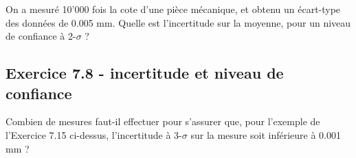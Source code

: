 On a mesuré 10'000 fois la cote d'une pièce mécanique, et obtenu un écart-type des données de 0.005 mm. Quelle est l'incertitude sur la moyenne, pour un niveau de confiance à 2-$\sigma$ ?

\subsection*{Exercice 7.8 - incertitude et niveau de confiance}

Combien de mesures faut-il effectuer pour s'assurer que, pour l'exemple de l'Exercice 7.15 ci-dessus, l'incertitude à 3-$\sigma$ sur la mesure soit inférieure à 0.001 mm ?

